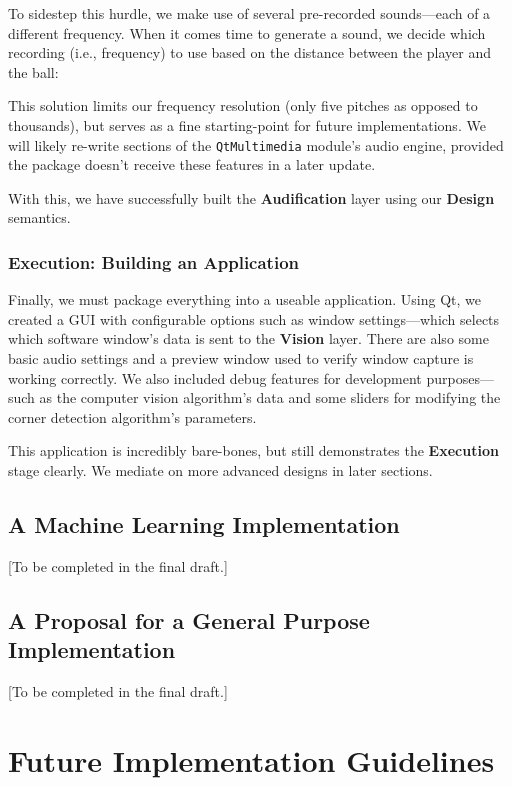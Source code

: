 \documentclass{report}
\newcommand{\design}{\textbf{Design}\xspace}
\newcommand{\exec}{\textbf{Execution}\xspace}
\newcommand{\vision}{\textbf{Vision}\xspace}
\newcommand{\audio}{\textbf{Audification}\xspace}
\begin{document}
To sidestep this hurdle, we make use of several pre-recorded sounds---each of a different frequency. When it comes time to generate a sound, we decide which recording (i.e., frequency) to use based on the distance between the player and the ball:


This solution limits our frequency resolution (only five pitches as opposed to thousands), but serves as a fine starting-point for future implementations. We will likely re-write sections of the \texttt{QtMultimedia} module's audio engine, provided the package doesn't receive these features in a later update.



With this, we have successfully built the \audio layer using our \design semantics. 

\subsection{Execution: Building an Application}
Finally, we must package everything into a useable application. Using Qt, we created a GUI with configurable options such as window settings---which selects which software window's data is sent to the \vision layer. There are also some basic audio settings and a preview window used to verify window capture is working correctly. We also included debug features for development purposes---such as the computer vision algorithm's data and some sliders for modifying the corner detection algorithm's parameters.

This application is incredibly bare-bones, but still demonstrates the \exec stage clearly. We mediate on more advanced designs in later sections.

\section{A Machine Learning Implementation}
[To be completed in the final draft.]

\section{A Proposal for a General Purpose Implementation}
[To be completed in the final draft.]

\chapter{Future Implementation Guidelines} 
\end{document}
